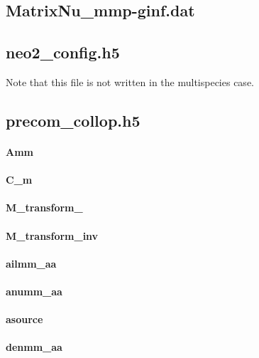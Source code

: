 \subsection{MatrixNu\_mmp-ginf.dat}

\subsection{neo2\_config.h5}
Note that this file is not written in the multispecies case.

\subsection{precom\_collop.h5}

\paragraph{Amm}

\paragraph{C\_m}

\paragraph{M\_transform\_}

\paragraph{M\_transform\_inv}

\paragraph{ailmm\_aa}

\paragraph{anumm\_aa}

\paragraph{asource}

\paragraph{denmm\_aa}

